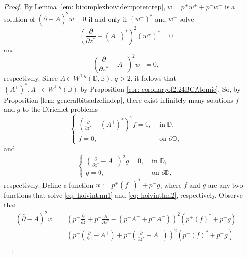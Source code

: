 \documentclass[12pt,reqno]{amsart}
\theoremstyle{definition}
\theoremstyle{remark}
\newcommand{\p}{\partial}
\newcommand{\dbar}{\bar\partial}
\newcommand{\bc}{\mathbb{B}}
\newcommand{\disk}{\mathbb{D}}
\begin{document}
            \begin{proof}

            

            

            

                 By Lemma \ref{lem: bicomplexhoividempotentrep}, $w = p^+ w^+ + p^-w^-$ is a solution of $(\dbar - A)^2 w = 0$ if and only if $(w^+)^*$ and $w^-$ solve
                 \[
                        \left( \frac{\p }{\p z^*} - (A^+)^*\right)^2 (w^+)^* = 0
                 \]
                 and 
                 \[ 
                        \left( \frac{\p}{\p z^*} - A^-\right)^2 w^- = 0,
                 \]
                 respectively. Since $A \in W^{1,q}(\disk, \bc)$, $q>2$, it follows that $(A^+)^*, A^- \in W^{1, q}(\disk)$ by Proposition \ref{cor: corollaryof2.24BCAtomic}. So, by Proposition \ref{lem: generalbitsadzelindep}, there exist infinitely many solutions $f$ and $g$ to the Dirichlet problems 
                 \begin{equation}\label{eq: hoivinthm1}
                    \begin{cases}
                        \left( \frac{\p }{\p z^*} - (A^+)^*\right)^2 f = 0, & \text{ in } \disk, \\
                        f = 0, & \text{ on }\p\disk,
                    \end{cases}
                 \end{equation}
                 and
                 \begin{equation}\label{eq: hoivinthm2}
                    \begin{cases}
                        \left( \frac{\p}{\p z^*} - A^-\right)^2 g = 0,& \text{ in }\disk,\\
                        g = 0, & \text{ on } \p\disk,
                    \end{cases}
                 \end{equation}
                 respectively. Define a function $w:= p^+ (f^+)^* + p^- g$, where $f$ and $g$ are any two functions that solve \eqref{eq: hoivinthm1} and \eqref{eq: hoivinthm2}, respectively. Observe that 
                 \begin{align*}
                    (\dbar - A)^2 w 
                    &=\left( p^+ \frac{\p}{\p z} + p^- \frac{\p}{\p z^*}- (p^+ A^+ + p^- A^-)\right )^2 (p^+ (f)^* + p^- g) \\
                    &= \left( p^+ \left(\frac{\p}{\p z}- A^+ \right) + p^- \left(\frac{\p}{\p z^*}-  A^-\right)\right )^2 (p^+ (f)^* + p^- g) \\

\end{align*}
\end{proof}
\end{document}
